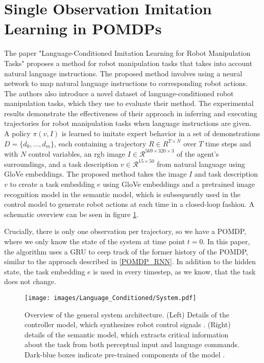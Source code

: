 \section{Single Observation Imitation Learning in POMDPs}
\label{LCILRM}
The paper "Language-Conditioned Imitation Learning for Robot Manipulation Tasks" \cite{stepputtis2020languageconditioned} proposes a method for robot manipulation tasks that takes 
into account natural language instructions. The proposed method involves using a neural network to map natural language instructions to 
corresponding robot actions. The authors also introduce a novel dataset of language-conditioned robot manipulation tasks, which they use to evaluate 
their method. The experimental results demonstrate the effectiveness of their approach in inferring and executing trajectories for robot manipulation 
tasks when language instructions are given.\\

A policy $\pi(v,I)$ is learned to imitate expert behavior in a set of demonstrations $D = \{d_0,...,d_m\}$, each containing a trajectory 
$R \in R^{T \times N}$ over $T$ time steps and with $N$ control variables, an rgb image $I \in \mathcal{R}^{569 \times 320 \times 3}$ of the agent's surroundings, 
and a task description $v \in \mathcal{R}^{15 \times 50}$ from natural language using GloVe \cite{pennington-etal-2014-glove} embeddings. The proposed method takes the image $I$ and task description $v$ 
to create a task embedding $e$ using GloVe embeddings and a pretrained image recognition model in the semantic model, 
which is subsequently used in the control model to generate robot actions at each time in a closed-loop 
fashion. A schematic overview can be seen in figure \ref{language_imitation}.

Crucially, there is only one observation per trajectory, so we have a POMDP, where we only know the state of the system at time point $t=0$. In this paper, the 
algorithm uses a GRU to ceep track of the former history of the POMDP, similar to the approach described in \ref{POMDP_RNN}. In addition to the hidden state, 
the task embedding $e$ is used in every timestep, as we know, that the task does not change. \\

\begin{figure}[htbp]
    \centering
    \texttt{[image: images/Language\_Conditioned/System.pdf]}
    \caption{Overview of the general system architecture. (Left) Details of the controller model, which
    synthesizes robot control signals . (Right) details of the semantic model, which extracts critical
    information about the task from both perceptual input and language commands. Dark-blue boxes
    indicate pre-trained components of the model \cite{stepputtis2020languageconditioned}.}
    \label{language_imitation}
\end{figure}

